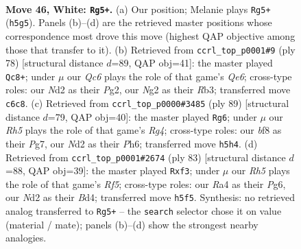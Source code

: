 \documentclass[11pt]{article}
\begin{document}
\clearpage

\begin{figure}[p]\centering
\begin{subfigure}{0.46\textwidth}\centering
\resizebox{\linewidth}{!}{%
\newchessgame
\chessboard[
  setfen={1r3bk1/1r3p2/2Q5/1n2p2R/R3P3/3K4/3N2N1/6q1 w - - 2 46},
  showmover=false,
  pgfstyle=straightmove, color=movearrow, markmove={h5-g5}
]}
\caption{}
\end{subfigure}\hfill
\begin{subfigure}{0.46\textwidth}\centering
\resizebox{\linewidth}{!}{%
\newchessgame
\chessboard[
  setfen={6k1/1p3rr1/4Qp2/p2P4/q7/1R6/6PK/5R2 w - - 6 40},
  showmover=false,
  pgfstyle=straightmove, color=movearrow, markmove={e6-c8}
]}
\caption{}
\end{subfigure}
\\[4pt]
\begin{subfigure}{0.46\textwidth}\centering
\resizebox{\linewidth}{!}{%
\newchessgame
\chessboard[
  setfen={4Qnk1/5pp1/7p/6r1/8/7P/1P1BR1PK/5q2 b - - 17 45},
  showmover=false,
  pgfstyle=straightmove, color=movearrow, markmove={g5-g6}
]}
\caption{}
\end{subfigure}\hfill
\begin{subfigure}{0.46\textwidth}\centering
\resizebox{\linewidth}{!}{%
\newchessgame
\chessboard[
  setfen={8/6kp/6p1/Q1n5/3b1r2/5P1q/6RP/1B3R1K b - - 0 42},
  showmover=false,
  pgfstyle=straightmove, color=movearrow, markmove={f4-f3}
]}
\caption{}
\end{subfigure}
\caption{\textbf{Move 46, White: \texttt{Rg5+}.} (a) Our position; Melanie plays \texttt{Rg5+} (\texttt{h5g5}). Panels (b)--(d) are the retrieved master positions whose correspondence most drove this move (highest QAP objective among those that transfer to it). (b) Retrieved from \texttt{ccrl\_top\_p0001\#9} (ply 78) [structural distance $d$=89, QAP obj=41]: the master played \texttt{Qc8+}; under $\mu$ our \emph{Qc6} plays the role of that game's \emph{Qe6}; cross-type roles: our \emph{N}d2 as their \emph{P}g2, our \emph{N}g2 as their \emph{R}b3; transferred move \texttt{c6c8}. (c) Retrieved from \texttt{ccrl\_top\_p0000\#3485} (ply 89) [structural distance $d$=79, QAP obj=40]: the master played \texttt{Rg6}; under $\mu$ our \emph{Rh5} plays the role of that game's \emph{Rg4}; cross-type roles: our \emph{b}f8 as their \emph{P}g7, our \emph{N}d2 as their \emph{P}h6; transferred move \texttt{h5h4}. (d) Retrieved from \texttt{ccrl\_top\_p0001\#2674} (ply 83) [structural distance $d$=88, QAP obj=39]: the master played \texttt{Rxf3}; under $\mu$ our \emph{Rh5} plays the role of that game's \emph{Rf5}; cross-type roles: our \emph{R}a4 as their \emph{P}g6, our \emph{N}d2 as their \emph{B}d4; transferred move \texttt{h5f5}. Synthesis: no retrieved analog transferred to \texttt{Rg5+} -- the \texttt{search} selector chose it on value (material / mate); panels (b)--(d) show the strongest nearby analogies.}
\label{fig:thought-m90}
\end{figure}
\end{document}
